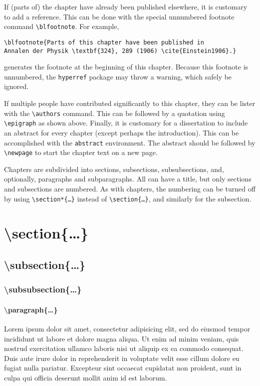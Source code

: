 If (parts of) the chapter have already been published elsewhere, it is customary to add a reference. This can be done with the special unnumbered footnote command \verb|\blfootnote|. For example,

\begin{verbatim}
\blfootnote{Parts of this chapter have been published in 
Annalen der Physik \textbf{324}, 289 (1906) \cite{Einstein1906}.}
\end{verbatim}
generates the footnote at the beginning of this chapter. Because this footnote is unnumbered, the \texttt{hyperref} package may throw a warning, which safely be ignored.

If multiple people have contributed significantly to this chapter, they can be lister with the \verb|\authors| command. This can be followed by a quotation using \verb|\epigraph| as shown above. Finally, it is customary for a dissertation to include an abstract for every chapter (except perhaps the introduction). This can be accomplished with the \texttt{abstract} environment. The abstract should be followed by \verb|\newpage| to start the chapter text on a new page.

Chapters are subdivided into sections, subsections, subsubsections, and, optionally, paragraphs and subparagraphs. All can have a title, but only sections and subsections are numbered. As with chapters, the numbering can be turned off by using \texttt{\textbackslash section*\{\ldots\}} instead of \texttt{\textbackslash section\{\ldots\}}, and similarly for the subsection.
\section{\textbackslash section\{\ldots\}}
\subsection{\textbackslash subsection\{\ldots\}}
\subsubsection{\textbackslash subsubsection\{\ldots\}}
\paragraph{\textbackslash paragraph\{\ldots\}}
Lorem ipsum dolor sit amet, consectetur adipisicing elit, sed do eiusmod tempor incididunt ut labore et dolore magna aliqua. Ut enim ad minim veniam, quis nostrud exercitation ullamco laboris nisi ut aliquip ex ea commodo consequat. Duis aute irure dolor in reprehenderit in voluptate velit esse cillum dolore eu fugiat nulla pariatur. Excepteur sint occaecat cupidatat non proident, sunt in culpa qui officia deserunt mollit anim id est laborum.



